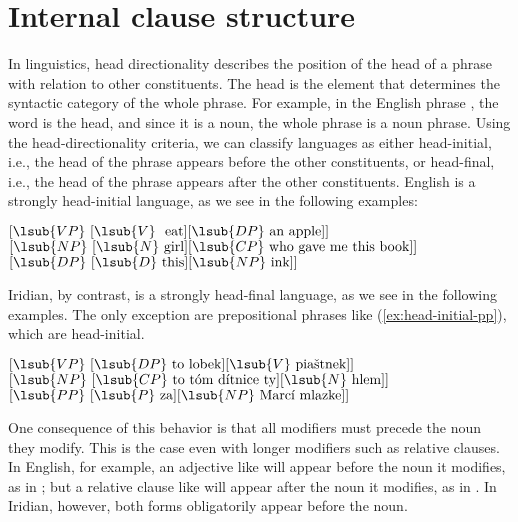\section{Internal clause structure}\label{sec:internal-clause-structure}

In linguistics, head directionality describes the position of the head of a
phrase with relation to other constituents. The {\sc head} is the element that
determines the syntactic category of the whole phrase. For example, in the
English phrase , the word  is the head, and
since it is a noun, the whole phrase is a noun phrase. Using the
head-directionality criteria, we can classify languages as either head-initial,
i.e., the head of the phrase appears before the other constituents, or
head-final, i.e., the head of the phrase appears after the other constituents.
English is a strongly head-initial language, as we see in the following
examples:

\pex
\a \([{}\lsub{VP}~[{}\lsub{V}~\text{ eat}] [{}\lsub{DP}~\text{an apple}]]\)
\a \([{}\lsub{NP}~[{}\lsub{N}~\text{girl}] [{}\lsub{CP}~\text{who gave me this book}]]\)
\a \([{}\lsub{DP}~[{}\lsub{D}~\text{this}] [{}\lsub{NP}~\text{ink}]]\)
\xe

Iridian, by contrast, is a strongly head-final language, as we see in the
following examples. The only exception are prepositional phrases like
(\ref{ex:head-initial-pp}), which are head-initial.

\pex
\a \([{}\lsub{VP}~[{}\lsub{DP}~\text{to lobek}] [{}\lsub{V}~\text{piaštnek}]]\)\\
\a \([{}\lsub{NP}~[{}\lsub{CP}~\text{to tóm dítnice ty}] [{}\lsub{N}~\text{hlem}] ]\)\\
\a\label{ex:head-initial-pp}\([{}\lsub{PP}~[{}\lsub{P}~\text{za}] [{}\lsub{NP}~\text{Marcí mlazke}] ]\)\\
\xe

One consequence of this behavior is that all modifiers must precede the noun
they modify. This is the case even with longer modifiers such as relative
clauses. In English, for example, an adjective like  will appear
before the noun it modifies, as in ; but a relative clause
like  will appear after the noun it modifies,
as in . In Iridian, however, both
forms obligatorily appear before the noun.

